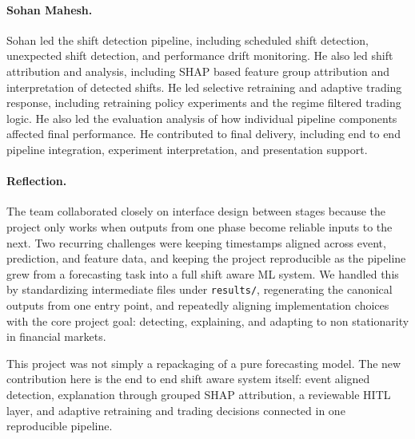 \documentclass[11pt]{article}
\begin{document}
\paragraph{Sohan Mahesh.}
Sohan led the shift detection pipeline, including scheduled shift detection, unexpected shift detection, and performance drift monitoring. He also led shift attribution and analysis, including SHAP based feature group attribution and interpretation of detected shifts. He led selective retraining and adaptive trading response, including retraining policy experiments and the regime filtered trading logic. He also led the evaluation analysis of how individual pipeline components affected final performance. He contributed to final delivery, including end to end pipeline integration, experiment interpretation, and presentation support.

\paragraph{Reflection.}
The team collaborated closely on interface design between stages because the project only works when outputs from one phase become reliable inputs to the next. Two recurring challenges were keeping timestamps aligned across event, prediction, and feature data, and keeping the project reproducible as the pipeline grew from a forecasting task into a full shift aware ML system. We handled this by standardizing intermediate files under \texttt{results/}, regenerating the canonical outputs from one entry point, and repeatedly aligning implementation choices with the core project goal: detecting, explaining, and adapting to non stationarity in financial markets.

This project was not simply a repackaging of a pure forecasting model. The new contribution here is the end to end shift aware system itself: event aligned detection, explanation through grouped SHAP attribution, a reviewable HITL layer, and adaptive retraining and trading decisions connected in one reproducible pipeline.
\end{document}
